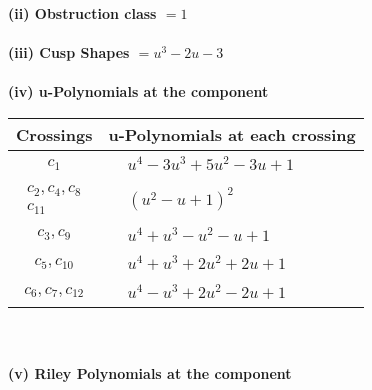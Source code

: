 \documentclass[1p]{elsarticle_modified}
\theoremstyle{definition}
\begin{document}
\flushleft \textbf{(ii) Obstruction class $= 1$}\\~\\
\flushleft \textbf{(iii) Cusp Shapes $= u^3-2 u-3$}\\~\\
\newpage\renewcommand{\arraystretch}{1}
\flushleft \textbf{(iv) u-Polynomials at the component}\newline \\
\begin{tabular}{m{50pt}|m{274pt}}
Crossings & \hspace{64pt}u-Polynomials at each crossing \\
\hline $$\begin{aligned}c_{1}\end{aligned}$$&$\begin{aligned}
&u^4-3 u^3+5 u^2-3 u+1
\end{aligned}$\\
\hline $$\begin{aligned}c_{2},c_{4},c_{8}\\c_{11}\end{aligned}$$&$\begin{aligned}
&(u^2- u+1)^2
\end{aligned}$\\
\hline $$\begin{aligned}c_{3},c_{9}\end{aligned}$$&$\begin{aligned}
&u^4+u^3- u^2- u+1
\end{aligned}$\\
\hline $$\begin{aligned}c_{5},c_{10}\end{aligned}$$&$\begin{aligned}
&u^4+u^3+2 u^2+2 u+1
\end{aligned}$\\
\hline $$\begin{aligned}c_{6},c_{7},c_{12}\end{aligned}$$&$\begin{aligned}
&u^4- u^3+2 u^2-2 u+1
\end{aligned}$\\
\hline
\end{tabular}\\~\\
\newpage\renewcommand{\arraystretch}{1}
\flushleft \textbf{(v) Riley Polynomials at the component}\newline \\
\end{document}
